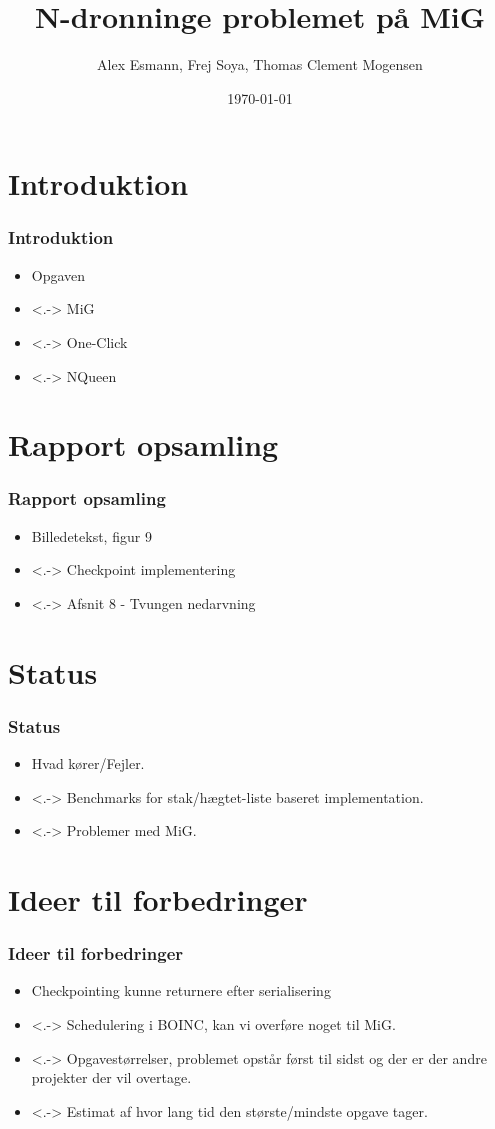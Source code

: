 \documentclass{beamer}
\title{N-dronninge problemet på MiG}
\author{Alex Esmann, Frej Soya, Thomas Clement Mogensen}
\date{\today}
\begin{document}
\frame{\titlepage}
\frame{\tableofcontents}
\section{Introduktion}
\frame
{
	\frametitle{Introduktion}

	\begin{itemize}
	\item<1-> Opgaven
	\item<.-> MiG
	\item<.-> One-Click
	\item<.-> NQueen
	\end{itemize}
}


\section{Rapport opsamling}
\frame
{
  \frametitle{Rapport opsamling}

  \begin{itemize}
  \item<1-> Billedetekst, figur 9
  \item<.-> Checkpoint  implementering
	\item<.-> Afsnit 8 - Tvungen nedarvning
  \end{itemize}
}

\section{Status}
\frame
{
  \frametitle{Status}

  \begin{itemize}
  \item<1-> Hvad kører/Fejler.
  \item<.-> Benchmarks for stak/hægtet-liste baseret implementation.
  \item<.-> Problemer med MiG.      
  \end{itemize}
}

\section{Ideer til forbedringer}
\frame
{
  \frametitle{Ideer til forbedringer}

  \begin{itemize}
  \item<1-> Checkpointing kunne returnere efter serialisering
  \item<.-> Schedulering i BOINC, kan vi overføre noget til MiG.
  \item<.-> Opgavestørrelser, problemet opstår først til sidst og der er der andre projekter der vil overtage.      
	\item<.-> Estimat af hvor lang tid den største/mindste opgave tager. 
  \end{itemize}
}
\end{document}
